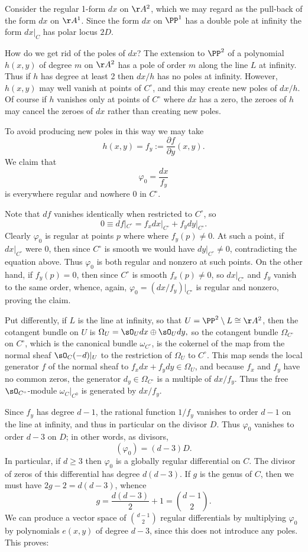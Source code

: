 Consider the
regular 1-form $dx$ on $\AA^2$, which we may regard as the pull-back of the form $dx$ on
 $\AA^{1}$.
Since the form $dx$ on $\PP^{1}$ has a double pole at infinity the form $dx|_{C}$ has polar
locus $2D$.
 
 \def\Co{{C^{\circ}}}
How do we get rid of the poles of $dx$? The extension to $\PP^2$ of a polynomial $h(x,y)$ of degree $m$ on
$\AA^2$ has a pole of order $m$ along the line $L$ at infinity. Thus if $h$ has degree at least 2 then $dx/h$ has no poles at infinity. However, $h(x,y)$ may well vanish at points of $\Co$, and this may create new poles of $dx/h$. Of course if $h$ vanishes only at  points of $\Co$ where $dx$ has a zero, the zeroes of $h$ may cancel the zeroes of $dx$ rather than creating new poles.
 
 To avoid producing new poles in this way we may take
 $$
 h(x,y) = f_{y} := \frac{\partial f}{\partial y}(x,y).
 $$
 We claim that 
 $$
\varphi_0 = \frac{dx}{f_{y}}
$$
is everywhere regular and nowhere 0 in $C^\circ$. 

Note that $df$ vanishes identically when restricted to $C^\circ$, so
 $$
 0 \equiv df|_{\Co} = f_{x}dx|_{\Co} + f_{y}dy|_{\Co} .
 $$
Clearly $\varphi_0$ is regular at points $p$ where
where $f_{y}(p) \neq 0$. At such a point, if $dx|_{\Co}$ were 0, then since $\Co$ is smooth we would have $dy|_{\Co} \neq 0$, contradicting the equation above. Thus $\varphi_{0}$ is both regular and nonzero at such points. On the other hand, if $f_{y}(p) = 0$, then since $\Co$ is smooth $f_{x}(p) \neq 0$, so $dx|_{\Co}$ and $f_{y}$ vanish to the same
order, whence, again, $\varphi_0 = (dx/f_{y})|_{\Co}$ is regular and nonzero, proving the claim.

Put differently, if $L$ is the line at infinity, so that $U = \PP^{2}\setminus L \cong \AA^{2}$,
then the cotangent bundle on $U$ is 
$\Omega_{U}=\sO_{U}dx \oplus \sO_{U}dy,$
so 
the cotangent bundle $\Omega_{\Co}$ on $C^{\circ}$, which is the canonical bundle $\omega_{\Co}$,
 is the cokernel of the map from the normal sheaf $\sO_{C}(-d)|_{U}$ to the restriction of 
$\Omega_{U}$ to $C^{\circ}$. This map sends the local generator $f$ of the normal sheaf to
$f_{x}dx+f_{y}dy \in \Omega_{U}$, and because $f_{x}$ and $f_{y}$ have no common zeros, the generator $d_{y} \in \Omega_{C^{\circ}}$ is a multiple of $dx/f_{y}$.
Thus the free $\sO_{C^{\circ}}$-module $\omega_{C}|_{C^{0}}$ is generated by $dx/f_{y}$.

Since $f_{y}$ has degree $d-1$, the rational function $1/f_{y}$ vanishes to order $d-1$ on the line
at infinity, and thus in particular on the divisor $D$. Thus $\varphi_0$ vanishes to order $d-3$ on $D$; in other words, as divisors,
$$
(\varphi_0) = (d-3)D.
$$
In particular, if $d \geq 3$ then $\varphi_0$ is a globally regular differential on $C$. The divisor of
zeros of this differential has degree $d(d-3)$. If $g$ is the genus of $C$, then we must
have $2g-2 = d(d-3)$, whence 
$$
g = \frac{d(d-3)}{2} + 1 = \binom{d-1}{2}.
$$
We can produce a vector space of $\binom{d-1}{2}$ regular differentials by multiplying $\varphi_0$ by 
polynomials $e(x,y)$ 
  of degree $d-3$, since this does not introduce any poles. This proves:

